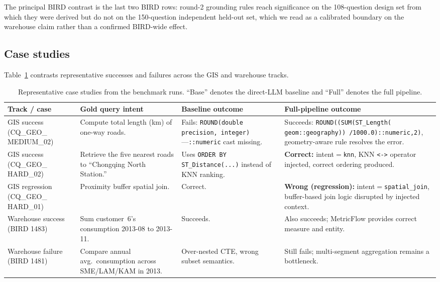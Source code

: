 \documentclass[11pt]{article}
\begin{document}
The principal BIRD contrast is the last two BIRD rows: round-2 grounding rules reach significance on the 108-question design set from which they were derived but do not on the 150-question independent held-out set, which we read as a calibrated boundary on the warehouse claim rather than a confirmed BIRD-wide effect.

\subsection{Case studies}

Table~\ref{tab:case} contrasts representative successes and failures across the GIS and warehouse tracks.

\begin{table}[p]
\centering
\scriptsize
\caption{Representative case studies from the benchmark runs. ``Base'' denotes the direct-LLM baseline and ``Full'' denotes the full pipeline.}
\label{tab:case}
\begin{tabular}{p{1.8cm} p{2.8cm} p{4.2cm} p{4.2cm}}
\toprule
Track / case & Gold query intent & Baseline outcome & Full-pipeline outcome \\
\midrule
GIS success (CQ\_GEO\_ MEDIUM\_02) & Compute total length (km) of one-way roads. & Fails: \texttt{ROUND(double precision, integer)}---\texttt{::numeric} cast missing. & Succeeds: \texttt{ROUND((SUM(ST\_Length( geom::geography)) /1000.0)::numeric,2)}, geometry-aware rule resolves the error. \\
\midrule
GIS success (CQ\_GEO\_ HARD\_02) & Retrieve the five nearest roads to ``Chongqing North Station.'' & Uses \texttt{ORDER BY ST\_Distance(...)} instead of KNN ranking. & \textbf{Correct:} intent$=$\texttt{knn}, KNN \texttt{<->} operator injected, correct ordering produced. \\
\midrule
GIS regression (CQ\_GEO\_ HARD\_01) & Proximity buffer spatial join. & Correct. & \textbf{Wrong (regression):} intent$=$\texttt{spatial\_join}, buffer-based join logic disrupted by injected context. \\
\midrule
Warehouse success (BIRD 1483) & Sum customer~6's consumption 2013-08 to 2013-11. & Succeeds. & Also succeeds; MetricFlow provides correct measure and entity. \\
\midrule
Warehouse failure (BIRD 1481) & Compare annual avg.\ consumption across SME/LAM/KAM in 2013. & Over-nested CTE, wrong subset semantics. & Still fails; multi-segment aggregation remains a bottleneck. \\
\bottomrule
\end{tabular}
\end{table}
\end{document}
